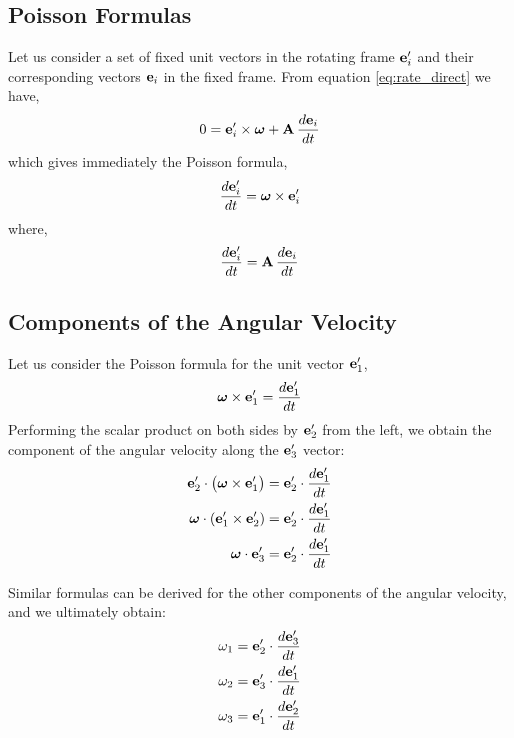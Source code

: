 \documentclass[12pt]{article}
\begin{document}
\subsection{Poisson Formulas}

Let us consider a set of fixed unit vectors in the rotating frame $\vb{e}'_i$ and their
corresponding vectors $\vb{e}_i$ in the fixed frame. From equation \eqref{eq:rate_direct} we
have,
\begin{equation}
  0 = \vb{e}'_i \times \boldsymbol{\omega} + \vb{A}\,\frac{d\vb{e}_i}{dt}
\end{equation}
which gives immediately the Poisson formula,
\begin{equation}
  \frac{d\vb{e}'_i}{dt} = \boldsymbol{\omega} \times \vb{e}'_i
\end{equation}
where,
\begin{equation}
  \frac{d\vb{e}'_i}{dt} = \vb{A}\,\frac{d\vb{e}_i}{dt}
\end{equation}

\subsection{Components of the Angular Velocity}

Let us consider the Poisson formula for the unit vector $\vb{e}'_1$,
\begin{equation}
  \boldsymbol{\omega} \times \vb{e}'_1 = \frac{d\vb{e}'_1}{dt}
\end{equation}
Performing the scalar product on both sides by $\vb{e}'_2$ from the left, we obtain the
component of the angular velocity along the $\vb{e}'_3$ vector:
\begin{align}
  \vb{e}'_2 \cdot \bigl(\boldsymbol{\omega} \times \vb{e}'_1\bigr)
    &= \vb{e}'_2 \cdot \frac{d\vb{e}'_1}{dt} \\
  \boldsymbol{\omega} \cdot (\vb{e}'_1 \times \vb{e}'_2)
    &= \vb{e}'_2 \cdot \frac{d\vb{e}'_1}{dt} \\
  \boldsymbol{\omega} \cdot \vb{e}'_3
    &= \vb{e}'_2 \cdot \frac{d\vb{e}'_1}{dt}
\end{align}

Similar formulas can be derived for the other components of the angular velocity, and we
ultimately obtain:
\begin{align}
  \omega_1 &= \vb{e}'_2 \cdot \frac{d\vb{e}'_3}{dt} \\
  \omega_2 &= \vb{e}'_3 \cdot \frac{d\vb{e}'_1}{dt} \\
  \omega_3 &= \vb{e}'_1 \cdot \frac{d\vb{e}'_2}{dt}
\end{align}
\end{document}
